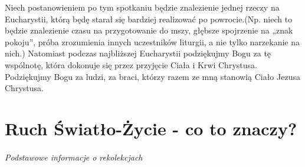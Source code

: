 \documentclass[a5paper,10pt,polish]{book}
\begin{document}
Niech postanowieniem po tym spotkaniu będzie znalezienie jednej rzeczy na Eucharystii, którą będę starał się bardziej realizować po powrocie.(Np. niech to będzie znalezienie czasu na przygotowanie do mszy, głębsze spojrzenie na „znak pokoju”, próba zrozumienia innych uczestników liturgii, a nie tylko narzekanie na nich.) Natomiast podczas najbliższej Eucharystii podziękujmy Bogu za tę wspólnotę, która dokonuje się przez przyjęcie Ciała i Krwi Chrystusa. Podziękujmy Bogu za ludzi, za braci, którzy razem ze mną stanowią Ciało Jezusa Chrystusa.


\part{Ruch Światło-Życie - co to znaczy?}
\label{babice2006-jesien-gliwice/index:ruch-swiatlo-zycie-co-to-znaczy}\label{babice2006-jesien-gliwice/index::doc}\paragraph{Podstawowe informacje o rekolekcjach}
\end{document}
